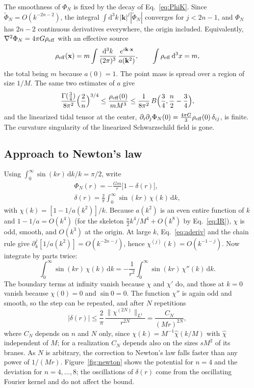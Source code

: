 \documentclass[a4paper,11pt]{article}
\newcommand{\dd}{\mathrm{d}}
\begin{document}
The smoothness of $\Phi_N$ is fixed by the decay of Eq.~\eqref{eq:PhiK}. Since $\tilde\Phi_N=O(k^{-2n-2})$, the integral $\int\dd^3k\,|\mathbf k|^j|\tilde\Phi_N|$ converges for $j<2n-1$, and $\Phi_N$ has $2n-2$ continuous derivatives everywhere, the origin included. Equivalently, $\nabla^2\Phi_N=4\pi G\rho_{\rm eff}$ with an effective source
\begin{equation}
\label{eq:rhoeff}
\rho_{\rm eff}(\mathbf x)=m\int\frac{\dd^3k}{(2\pi)^3}\,\frac{e^{i\mathbf k\cdot\mathbf x}}{a(\mathbf k^2)},\qquad\int\rho_{\rm eff}\,\dd^3x=m,
\end{equation}
the total being $m$ because $a(0)=1$. The point mass is spread over a region of size $1/M$. The same two estimates of $a$ give
\[
\frac{\Gamma(\frac34)}{8\pi^2}\Bigl(\frac2n\Bigr)^{3/4}\le\frac{\rho_{\rm eff}(0)}{mM^3}\le\frac{1}{8\pi^2}\,B\Bigl(\frac34,\frac n2-\frac34\Bigr),
\]
and the linearized tidal tensor at the center, $\partial_i\partial_j\Phi_N(0)=\frac{4\pi G}3\rho_{\rm eff}(0)\,\delta_{ij}$, is finite. The curvature singularity of the linearized Schwarzschild field is gone.

\subsection{Approach to Newton's law}

Using $\int_0^\infty\sin(kr)\,\dd k/k=\pi/2$, write
\begin{equation}
\label{eq:delta}
\begin{gathered}
\Phi_N(r)=-\frac{Gm}r\bigl[1-\delta(r)\bigr],\\
\delta(r)=\frac2\pi\int_0^\infty\sin(kr)\,\chi(k)\,\dd k ,
\end{gathered}
\end{equation}
with $\chi(k)=[1-1/a(k^2)]/k$. Because $a(k^2)$ is an even entire function of $k$ and $1-1/a=O(k^4)$ (for the skeleton $\frac n2k^4/M^4+O(k^8)$ by Eq.~\eqref{eq:IR}), $\chi$ is odd, smooth, and $O(k^3)$ at the origin. At large $k$, Eq.~\eqref{eq:aderiv} and the chain rule give $\partial_k^j[1/a(k^2)]=O(k^{-2n-j})$, hence $\chi^{(j)}(k)=O(k^{-1-j})$. Now integrate by parts twice:
\[
\int_0^\infty\sin(kr)\,\chi(k)\,\dd k=-\frac1{r^2}\int_0^\infty\sin(kr)\,\chi''(k)\,\dd k .
\]
The boundary terms at infinity vanish because $\chi$ and $\chi'$ do, and those at $k=0$ vanish because $\chi(0)=0$ and $\sin0=0$. The function $\chi''$ is again odd and smooth, so the step can be repeated, and after $N$ repetitions
\begin{equation}
\label{eq:tail}
|\delta(r)|\le\frac2\pi\,\frac{\|\chi^{(2N)}\|_{L^1}}{r^{2N}}=\frac{C_N}{(Mr)^{2N}},
\end{equation}
where $C_N$ depends on $n$ and $N$ only, since $\chi(k)=M^{-1}\hat\chi(k/M)$ with $\hat\chi$ independent of $M$; for a realization $C_N$ depends also on the sizes $sM^2$ of its branes. As $N$ is arbitrary, the correction to Newton's law falls faster than any power of $1/(Mr)$. Figure~\ref{fig:newton} shows the potential for $n=4$ and the deviation for $n=4,\dots,8$; the oscillations of $\delta(r)$ come from the oscillating Fourier kernel and do not affect the bound.
\end{document}
